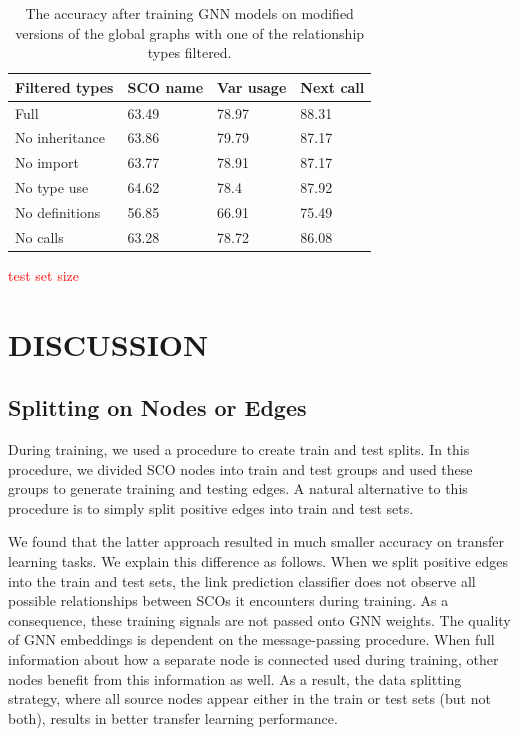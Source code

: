 \documentclass[a4paper,twoside]{article}
\begin{document}
\begin{table}[]
\centering
\begin{tabular}{p{1.8cm}p{1.3cm}p{1.4cm}p{1.32cm}}
\toprule
\textbf{Filtered types} & \textbf{SCO name} & \textbf{Var usage} & \textbf{Next call} \\\midrule
Full                         & 63.49             & 78.97              & 88.31              \\\midrule
No inheritance              & 63.86             & 79.79              & 87.17              \\\midrule
No import                    & 63.77             & 78.91              & 87.17              \\\midrule
No type use                  & 64.62             & 78.4               & 87.92              \\\midrule
No definitions            & 56.85             & 66.91              & 75.49              \\\midrule
No calls                     & 63.28             & 78.72              & 86.08    \\         \bottomrule
\end{tabular}
\caption{The accuracy after training GNN models on modified versions of the global graphs with one of the relationship types filtered.}
\label{tbl:ablation}
\end{table}

\textcolor{red}{test set size}

\section{\uppercase{Discussion}}\label{sec:discuss}

\subsection{Splitting on Nodes or Edges}

During training, we used a procedure to create train and test splits. In this procedure, we divided SCO nodes into train and test groups and used these groups to generate training and testing edges. A natural alternative to this procedure is to simply split positive edges into train and test sets.

We found that the latter approach resulted in much smaller accuracy on transfer learning tasks. We explain this difference as follows. When we split positive edges into the train and test sets, the link prediction classifier does not observe all possible relationships between SCOs it encounters during training. As a consequence, these training signals are not passed onto GNN weights. The quality of GNN embeddings is dependent on the message-passing procedure. When full information about how a separate node is connected used during training, other nodes benefit from this information as well. As a result, the data splitting strategy, where all source nodes appear either in the train or test sets (but not both), results in better transfer learning performance. 
\end{document}
